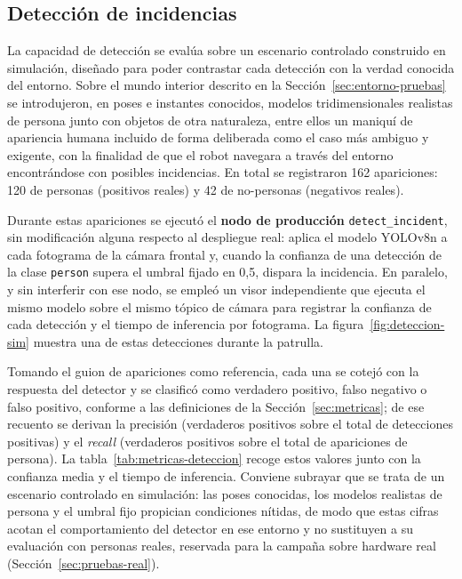 \subsection{Detección de incidencias}
\label{sec:resultados-deteccion}

La capacidad de detección se evalúa sobre un escenario controlado construido en simulación,
diseñado para poder contrastar cada detección con la verdad conocida del entorno. Sobre el
mundo interior descrito en la Sección~\ref{sec:entorno-pruebas} se introdujeron, en poses e
instantes conocidos, modelos tridimensionales realistas de persona junto
con objetos de otra naturaleza, entre ellos un maniquí de apariencia humana incluido de forma
deliberada como el caso más ambiguo y exigente, con la finalidad de que el robot navegara a través del entorno 
encontrándose con posibles incidencias. En total se registraron 162 apariciones: 120
de personas (positivos reales) y 42 de no-personas (negativos reales).

Durante estas apariciones se ejecutó el \textbf{nodo de producción} \texttt{detect\_incident},
sin modificación alguna respecto al despliegue real: aplica el modelo YOLOv8n a cada fotograma
de la cámara frontal y, cuando la confianza de una detección de la clase \texttt{person} supera
el umbral fijado en 0,5, dispara la incidencia. En paralelo, y sin interferir con ese nodo, se
empleó un visor independiente que ejecuta el mismo modelo sobre el mismo tópico de cámara para
registrar la confianza de cada detección y el tiempo de inferencia por fotograma. La
figura~\ref{fig:deteccion-sim} muestra una de estas detecciones durante la patrulla.

Tomando el guion de apariciones como referencia, cada una se cotejó con la respuesta del
detector y se clasificó como verdadero positivo, falso negativo o falso positivo, conforme a
las definiciones de la Sección~\ref{sec:metricas}; de ese recuento se derivan la precisión
(verdaderos positivos sobre el total de detecciones positivas) y el \textit{recall} (verdaderos
positivos sobre el total de apariciones de persona). La tabla~\ref{tab:metricas-deteccion}
recoge estos valores junto con la confianza media y el tiempo de inferencia. Conviene subrayar
que se trata de un escenario controlado en simulación: las poses conocidas, los modelos
realistas de persona y el umbral fijo propician condiciones nítidas, de modo que estas cifras
acotan el comportamiento del detector en ese entorno y no sustituyen a su evaluación con
personas reales, reservada para la campaña sobre hardware real (Sección~\ref{sec:pruebas-real}).

